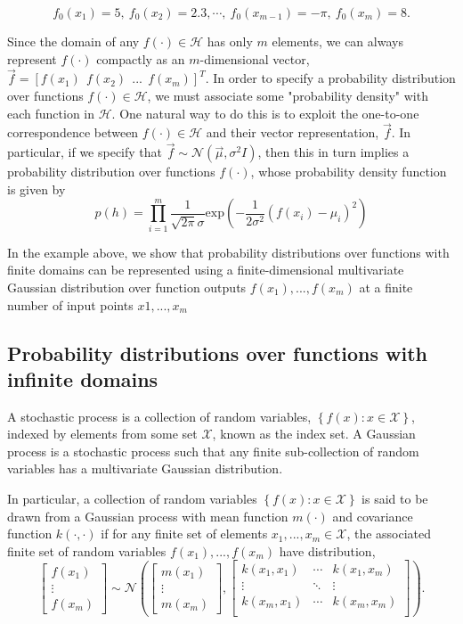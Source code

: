 \documentclass{article}
\begin{document}
$$f_0(x_1)=5,~f_0(x_2)=2.3, \dotsb ,~f_0(x_{m-1})=-\pi,~f_0(x_m)=8.$$

Since the domain of any $f(\cdot) \in \mathcal{H}$ has only $m$ elements, we can always represent $f(\cdot)$ compactly as an $m$-dimensional vector, $\vec{f}=[f(x_1)~~f(x_2)~~...~~f(x_m) ]^T$. In order to specify a probability distribution over functions $f(\cdot) \in \mathcal{H}$, we must associate some "probability density" with each function in $\mathcal{H}$. One natural way to do this is to exploit the one-to-one correspondence between $f(\cdot) \in \mathcal{H}$ and their vector representation, $\vec{f}$. In particular, if we specify that $\vec{f}\sim \mathcal{N}(\vec{\mu},\sigma ^2I)$, then this in turn implies a probability distribution over functions $f(\cdot)$, whose probability density function is given by
$$p(h) = \prod_{i=1}^{m} \frac{1}{\sqrt{2\pi}\sigma}\mathrm{exp}(-\frac{1}{2\sigma ^2} (f(x_i)-\mu _i)^2)
$$

In the example above, we show that probability distributions over functions with finite domains can be represented using a finite-dimensional multivariate Gaussian distribution over function outputs $f(x_1),...,f(x_m)$ at a finite number of input points $x1, ..., x_m$

\subsection{Probability distributions over functions with infinite domains}
A stochastic process is a collection of random variables, $\left \{ f(x): x \in \mathcal{X} \right \}$, indexed by elements from some set $\mathcal{X}$, known as the index set. A Gaussian process is a stochastic process such that any finite sub-collection of random variables has a multivariate Gaussian distribution.

In particular, a collection of random variables $\left \{ f(x): x \in \mathcal{X} \right \}$ is said to be drawn from a Gaussian process with mean function $m(\cdot)$ and covariance function $k(\cdot , \cdot)$ if for any finite set of elements $x_1,...,x_m \in \mathcal{X}$, the associated finite set of random variables $f(x_1),...,f(x_m)$ have distribution,
$$\begin{bmatrix}
f(x_1)\\
\vdots \\
f(x_m) 
\end{bmatrix} \sim \mathcal{N} \left( 
\begin{bmatrix}
m(x_1)\\
\vdots \\
m(x_m) 
\end{bmatrix}, \begin{bmatrix}
k(x_1, x_1) & \cdots & k(x_1, x_m) \\
\vdots & \ddots & \vdots\\
k(x_m, x_1) & \cdots & k(x_m, x_m) \\
\end{bmatrix} 
\right).$$
\end{document}
